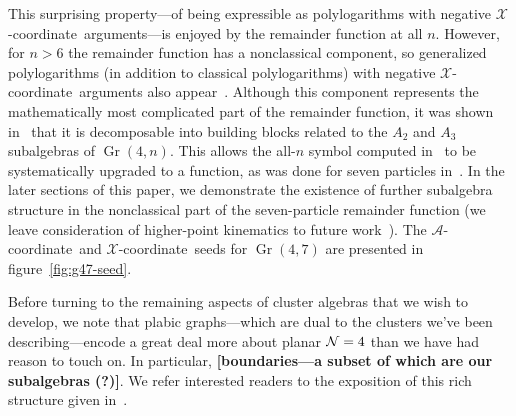 \documentclass[11pt]{article}
\DeclareMathOperator{\Gr}{Gr}
\def\xcoord{$\mathcal{X}$-coordinate}
\def\acoord{$\mathcal{A}$-coordinate}
\def\draftnote#1{{\bf [#1]}}
\begin{document}
This surprising property---of being expressible as polylogarithms with negative \xcoord\ arguments---is enjoyed by the remainder function at all $n$. However, for $n>6$ the remainder function has a nonclassical component, so generalized polylogarithms (in addition to classical polylogarithms) with negative \xcoord\ arguments also appear~\cite{}. Although this component represents the mathematically most complicated part of the remainder function, it was shown in~\cite{Golden:2014xqa} that it is decomposable into building blocks related to the $A_2$ and $A_3$ subalgebras of $\Gr(4,n)$. This allows the all-$n$ symbol computed in~\cite{CaronHuot:2011ky} to be systematically upgraded to a function, as was done for seven particles in~\cite{Golden:2014xqf}. In the later sections of this paper, we demonstrate the existence of further subalgebra structure in the nonclassical part of the seven-particle remainder function (we leave consideration of higher-point kinematics to future work~\cite{cluster_subalgebras_ii}). The \acoord\ and \xcoord\ seeds for $\Gr(4,7)$ are presented in figure~\ref{fig:g47-seed}.

Before turning to the remaining aspects of cluster algebras that we wish to develop, we note that plabic graphs---which are dual to the clusters we've been describing---encode a great deal more about planar ${\cal N}=4$ than we have had reason to touch on. In particular, \draftnote{boundaries---a subset of which are our subalgebras (?)}. We refer interested readers to the exposition of this rich structure given in~\cite{ArkaniHamed:2012nw}.
\end{document}
